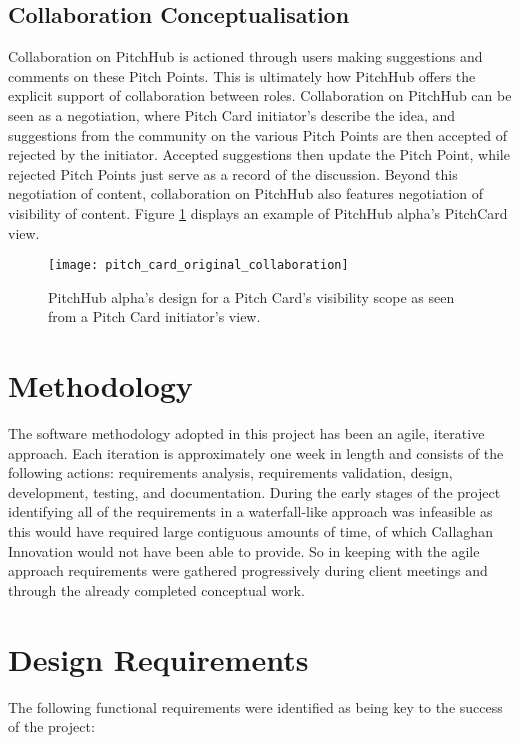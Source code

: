 \subsection{Collaboration Conceptualisation}
Collaboration on PitchHub is actioned through users making suggestions and comments on these Pitch Points. This is ultimately how PitchHub offers the explicit support of collaboration between roles. Collaboration on PitchHub can be seen as a negotiation, where Pitch Card initiator's describe the idea, and suggestions from the community on the various Pitch Points are then accepted of rejected by the initiator. Accepted suggestions then update the Pitch Point, while rejected Pitch Points just serve as a record of the discussion. Beyond this negotiation of content, collaboration on PitchHub also features negotiation of visibility of content. Figure \ref{fig:pitch_card_original_collaboration} displays an example of PitchHub alpha's PitchCard view.
\begin{figure}[ht]
    \centering
    \texttt{[image: pitch\_card\_original\_collaboration]}
    \caption{PitchHub alpha's design for a Pitch Card's visibility scope as seen from a Pitch Card initiator's view.}
    \label{fig:pitch_card_original_collaboration}
\end{figure}

\section{Methodology}
The software methodology adopted in this project has been an agile, iterative approach. Each iteration is approximately one week in length and consists of the following actions: requirements analysis, requirements validation, design, development, testing, and documentation. During the early stages of the project identifying all of the requirements in a waterfall-like approach was infeasible as this would have required large contiguous amounts of time, of which Callaghan Innovation would not have been able to provide. So in keeping with the agile approach requirements were gathered progressively during client meetings and through the already completed conceptual work. 

\section{Design Requirements}\label{S:designRequirements}
The following functional requirements were identified as being key to the success of the project:


